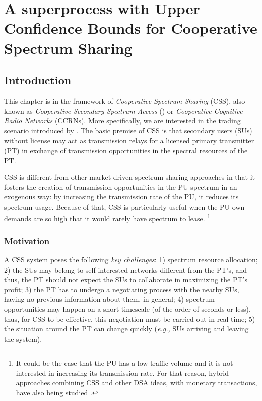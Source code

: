 \graphicspath{ {img/MAB_CSSA/} }
\chapter[A superprocess with Upper Confidence Bounds for Cooperative Spectrum Sharing][A superprocess with UCB for CSS]{A superprocess with Upper Confidence Bounds for Cooperative Spectrum Sharing}\label{MAB_CSSA_chap}

\section{Introduction}
This chapter is in the framework of \textit{Cooperative Spectrum Sharing} (CSS), also known as \textit{Cooperative Secondary Spectrum Access} () or \textit{Cooperative Cognitive Radio Networks} (CCRNs). 
More specifically, we are interested in the trading scenario introduced by \cite{ref:Simeone2008}. 
The basic premise of CSS is that secondary users (SUs) without license may act as transmission relays for a licensed primary transmitter (PT) in exchange of transmission opportunities in the spectral resources of the PT.

CSS is different from other market-driven spectrum sharing approaches in that it fosters the creation of transmission opportunities in the PU spectrum in an exogenous way: by increasing the transmission rate of the PU, it reduces its spectrum usage. 
Because of that, CSS is particularly useful when the PU own demands are so high that it would rarely have spectrum to lease.
\footnote{It could be the case that the PU has a low traffic volume and it is not interested in increasing its transmission rate. 
For that reason, hybrid approaches combining CSS and other DSA ideas, with monetary transactions, have also being studied \cite{ref:Zhang2009,ref:Zhang2012_Fair}.}

\subsection{Motivation}
A CSS system poses the following \textit{key challenges}: 1) spectrum resource allocation; 2) the SUs may belong to self-interested networks different from the PT's, and thus, the PT should not expect the SUs to collaborate in maximizing the PT's profit; 3) the PT has to undergo a negotiating process with the nearby SUs, having no previous information about them, in general; 4) spectrum opportunities may happen on a short timescale (of the order of seconds or less), thus, for CSS to be effective, this negotiation must be carried out in real-time; 5) the situation around the PT can change quickly (\textit{e.g.,} SUs arriving and leaving the system). 


